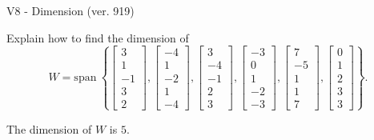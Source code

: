 \begin{exercise}
  \begin{exerciseTitle}V8 - Dimension (ver. 919)\end{exerciseTitle}
  \begin{exerciseStatement}
    Explain how to find the dimension of 
\[W=\mathrm{span}\ \left\{\left[\begin{array}{r}
3 \\
1 \\
-1 \\
3 \\
2
\end{array}\right] , \left[\begin{array}{r}
-4 \\
1 \\
-2 \\
1 \\
-4
\end{array}\right] , \left[\begin{array}{r}
3 \\
-4 \\
-1 \\
2 \\
3
\end{array}\right] , \left[\begin{array}{r}
-3 \\
0 \\
1 \\
-2 \\
-3
\end{array}\right] , \left[\begin{array}{r}
7 \\
-5 \\
1 \\
1 \\
7
\end{array}\right] , \left[\begin{array}{r}
0 \\
1 \\
2 \\
3 \\
3
\end{array}\right]\right\}.\]



  \end{exerciseStatement}
  \begin{exerciseAnswer}
   The dimension of \(W\) is  \(5\).
  


  \end{exerciseAnswer}
\end{exercise}